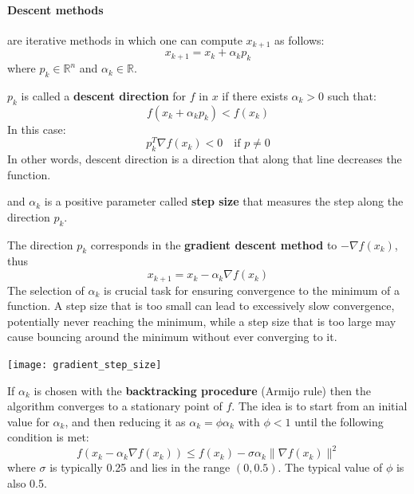 \documentclass{article}
\begin{document}
\paragraph{Descent methods} are iterative methods in which one can compute
$x_{k+1}$ as follows:
$$x_{k+1}=x_k+\alpha_kp_k$$
where $p_k\in \mathbb{R}^n$ and $\alpha_k\in \mathbb{R}$.
\begin{definition}
    $p_k$ is called a \textbf{descent direction} for $f$ in $x$ if there
    exists $\alpha_k>0$ such that:
    $$f(x_k+\alpha_k p_k)<f(x_k)$$
    In this case:
    $$p_k^T\nabla f(x_k)<0\quad\text{if } p\neq0$$
    In other words, descent direction is a direction that along that line
    decreases the function.
\end{definition}
and $\alpha_k$ is a positive parameter called \textbf{step size} that measures
the step along the direction $p_k$.

The direction $p_k$ corresponds in the \textbf{gradient
descent method} to $-\nabla f(x_k)$, thus
$$x_{k+1}=x_k-\alpha_k\nabla f(x_k)$$
The selection of $\alpha_k$ is crucial task for ensuring convergence to the
minimum of a function. A step size that is too small can lead to excessively
slow convergence, potentially never reaching the minimum, while a step size
that is too large may cause bouncing around the minimum without ever
converging to it.

\begin{center}
    \texttt{[image: gradient\_step\_size]}
\end{center}

If $\alpha_k$ is chosen with the \textbf{backtracking procedure} (Armijo rule) then the
algorithm converges to a stationary point of $f$. The idea is to start from
an initial value for $\alpha_k$, and then reducing it as
$\alpha_k=\phi\alpha_k$ with $\phi<1$ until the following condition is met:
$$f(x_k-\alpha_k\nabla f(x_k))\leq f(x_k)-\sigma\alpha_k \lVert \nabla
f(x_k)\rVert^2$$
where $\sigma$ is typically 0.25 and lies in the range $(0,0.5)$. The typical value
of $\phi$ is also 0.5.
\end{document}

